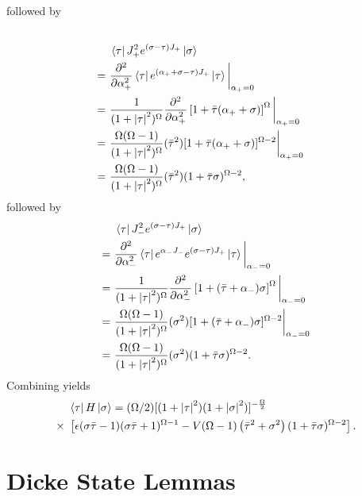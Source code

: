\documentclass[Dual]{msu-thesis}
\begin{document}
\begin{appendices}
followed by
\begin{align}
\\
&\bra{\tau}J^2_+e^{(\sigma-\tau) J_+}\ket{\sigma}
\nonumber
\\
= \ &
\frac{\partial^2}{\partial\alpha^2_+}\bra{\tau}e^{(\alpha_++\sigma-\tau) J_+}\ket{\tau}\bigg{|}_{\alpha_+=0}
\nonumber
\\
= \ &
\frac{1}{(1+\abs{\tau}^2)^{\Omega}}\frac{\partial^2}{\partial\alpha^2_+}\left[1+\bar{\tau}(\alpha_++\sigma)\right]^{\Omega}\bigg{|}_{\alpha_+=0}
\nonumber
\\
= \ &
\frac{\Omega(\Omega-1)}{(1+\abs{\tau}^2)^{\Omega}}(\bar{\tau}^2)[1+\bar{\tau}(\alpha_++\sigma)]^{\Omega-2}\bigg{|}_{\alpha_+=0}
\nonumber
\\
= \ &
\frac{\Omega(\Omega-1)}{(1+\abs{\tau}^2)^{\Omega}}(\bar{\tau}^2)(1+\bar{\tau}\sigma)^{\Omega-2},
\end{align}
followed by
\begin{align}
&\bra{\tau}J^2_-e^{(\sigma-\tau) J_+}\ket{\sigma}
\nonumber
\\
= \ &
\frac{\partial^2}{\partial\alpha^2_-}\bra{\tau}e^{\alpha_-J_-}e^{(\sigma-\tau) J_+}\ket{\tau}\bigg{|}_{\alpha_-=0}
\nonumber
\\
= \ &
\frac{1}{(1+\abs{\tau}^2)^{\Omega}}\frac{\partial^2}{\partial\alpha^2_-}\left[1+(\bar{\tau}+\alpha_-)\sigma\right]^{\Omega}\bigg{|}_{\alpha_-=0}
\nonumber
\\
= \ &
\frac{\Omega(\Omega-1)}{(1+\abs{\tau}^2)^{\Omega}}(\sigma^2)[1+(\bar{\tau}+\alpha_-)\sigma]^{\Omega-2}\bigg{|}_{\alpha_-=0}
\nonumber
\\
= \ &
\frac{\Omega(\Omega-1)}{(1+\abs{\tau}^2)^{\Omega}}(\sigma^2)(1+\bar{\tau}\sigma)^{\Omega-2}.
\end{align}
Combining yields
\begin{align}
\label{ths}
&\bra{\tau}H\ket{\sigma}
=
(\Omega/2)[(1+\abs{\tau}^2)(1+\abs{\sigma}^2)]^{-\frac{\Omega}{2}}
\nonumber
\\
\times \ &\left[ 
\epsilon(\sigma\bar{\tau}-1)(\sigma\bar{\tau}+1)^{\Omega-1}-V(\Omega-1)\left(\bar{\tau}^2+\sigma^2\right)(1+\bar{\tau}\sigma)^{\Omega-2}
\right].
\end{align}

\chapter{Dicke State Lemmas}
\label{app:dicke_state_lemmas}


\end{appendices}
\end{document}

